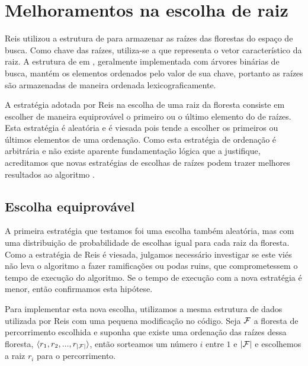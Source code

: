 \section{Melhoramentos na escolha de raiz}
Reis utilizou a estrutura de  para armazenar as raízes das 
florestas do espaço de busca. Como chave das raízes, utiliza-se a 
 que representa o vetor característico da raiz. A 
estrutura de  em , geralmente implementada
com árvores binárias de busca, mantém os elementos ordenados pelo valor
de sua chave, portanto as raízes são armazenadas de maneira ordenada
lexicograficamente.

A estratégia adotada por Reis na escolha de uma raiz da floresta 
consiste em escolher de maneira equiprovável o primeiro ou o último 
elemento do  de raízes. Esta estratégia é aleatória e é 
viesada pois tende a escolher os primeiros ou últimos elementos de uma 
ordenação. Como esta estratégia de ordenação é arbitrária e não existe 
aparente fundamentação lógica que a justifique, acreditamos que novas 
estratégias de escolhas de raízes podem trazer melhores resultados ao 
algoritmo .

\subsection{Escolha equiprovável}
A primeira estratégia que testamos foi uma escolha também aleatória, mas
com uma distribuição de probabilidade de escolhas igual para cada raiz
da floresta. Como a estratégia de Reis é viesada, julgamos necessário
investigar se este viés não leva o algoritmo a fazer ramificações ou 
podas ruins, que comprometessem o tempo de execução do algoritmo. Se
o tempo de execução com a nova estratégia é menor, então confirmamos
esta hipótese.

Para implementar esta nova escolha, utilizamos a mesma estrutura de 
dados utilizada por Reis com uma pequena modificação no código. Seja
$\mathcal{F}$ a floresta de percorrimento escolhida e suponha que existe
uma ordenação das raízes dessa floresta, 
$\langle r_1, r_2, ..., r_{|\mathcal{F}|} \rangle$, então sorteamos um 
número $i$ entre $1$ e $|\mathcal{F}|$ e escolhemos a raiz $r_{i}$ para o
percorrimento.


